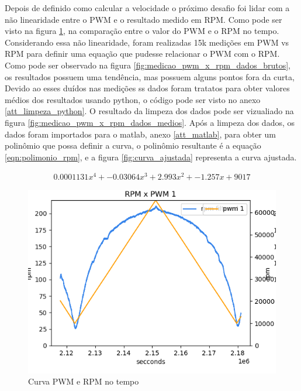 Depois de definido como calcular a velocidade o próximo desafio foi lidar com a não linearidade entre o PWM e o resultado medido em RPM.
Como pode ser visto na figura \ref{fig:grafico_pwm_x_rpm}, na comparação entre o valor do PWM e o RPM no tempo.
Considerando essa não linearidade, foram realizadas 15k medições em PWM vs RPM para definir uma equação que pudesse relacionar o PWM com o RPM.
Como pode ser observado na figura  \ref{fig:medicao_pwm_x_rpm_dados_brutos}, os resultados possuem uma tendência, mas possuem alguns pontos fora da curta,
Devido ao esses duídos nas medições ss dados foram tratatos para obter valores médios dos resultados usando python,
o código pode ser visto no anexo \ref{att_limpeza_python}.
O resultado da limpeza dos dados pode ser vizualiado na figura \ref{fig:medicao_pwm_x_rpm_dados_medios}.
Após a limpeza dos dados, os dados foram importados para o matlab, anexo \ref{att_matlab},
para obter um polinômio que possa definir a curva, o polinômio resultante é a equação \ref{eqn:polimonio_rpm}, e a figura \ref{fig:curva_ajustada} representa a curva ajustada.

\begin{equation}
    \begin{split}
        0.0001131x^{4} + -0.03064x^{3} + 2.993x^{2} + -1.257x + 9017
    \end{split}
    \label{eqn:polimonio_rpm}
\end{equation}


\begin{figure}[h]
	\centering
	\includegraphics{figures/pwm_x_rpm}
	\caption{Curva PWM e RPM no tempo}
	\label{fig:grafico_pwm_x_rpm}
\end{figure}


